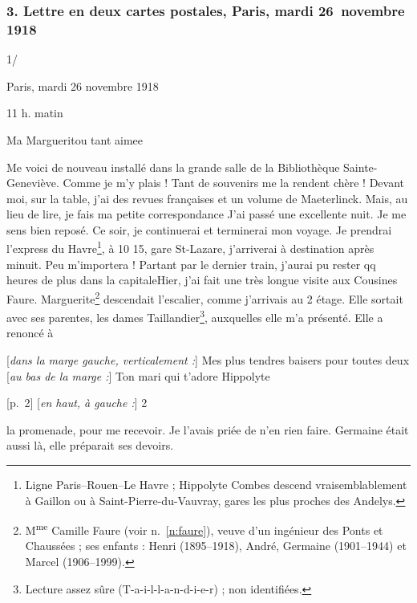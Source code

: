 \subsubsection*{3. Lettre en deux cartes postales, Paris, mardi 26~novembre 1918}

\begin{LJlettre}
 1/\par\nopagebreak[4]

Paris, mardi 26 novembre 1918

11 h. matin

Ma Margueritou\label{annexe:doc5-margueritou} tant aimee

Me voici de nouveau installé dans la grande salle de la Bibliothèque Sainte-Geneviève. Comme je m'y plais ! Tant de souvenirs me la rendent chère ! Devant moi, sur la table, j'ai des revues françaises et un volume de Maeterlinck. Mais, au lieu de lire, je fais ma petite correspondance J'ai passé une excellente nuit. Je me sens bien reposé. Ce soir, je continuerai et terminerai mon voyage. Je prendrai l'express du Havre\footnote{Ligne Paris--Rouen--Le Havre ; Hippolyte Combes descend vraisemblablement à Gaillon ou à Saint-Pierre-du-Vauvray, gares les plus proches des Andelys.}, à 10 15, gare St-Lazare, j'arriverai à destination après minuit. Peu m'importera ! Partant par le dernier train, j'aurai pu rester qq heures de plus dans la capitale\quad Hier, j'ai fait une très longue visite aux Cousines Faure. Marguerite\footnote{M\textsuperscript{me} Camille Faure (voir n.~\ref{n:faure}), veuve d'un ingénieur des Ponts et Chaussées ; ses enfants : Henri (1895--1918), André, Germaine (1901--1944) et Marcel (1906--1999).} descendait l'escalier, comme j'arrivais au 2 étage. Elle sortait avec ses parentes, les dames Taillandier\footnote{Lecture assez sûre (T-a-i-l-l-a-n-d-i-e-r) ; non identifiées.}, auxquelles elle m'a présenté. Elle a renoncé à

[\textit{dans la marge gauche, verticalement :}] Mes plus tendres baisers pour toutes deux [\textit{au bas de la marge :}] Ton mari qui t'adore Hippolyte

[p.~2] [\textit{en haut, à gauche :}] 2\par\nopagebreak[4]

la promenade, pour me recevoir. Je l'avais priée de n'en rien faire. Germaine était aussi là, elle préparait ses devoirs.


\end{LJlettre}
